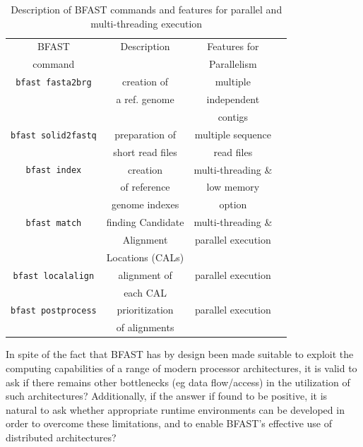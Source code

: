 \documentclass{acm_proc_article-sp}
\begin{document}
\begin{table}
\small
\begin{tabular}{|c|c|c|c|} 
  \hline BFAST & Description & Features for \\ command & & Parallelism
  \\ \hline \hline \texttt{bfast fasta2brg} & creation of & multiple \\ &a ref. genome &
  independent \\ & & contigs \\ \hline
  \texttt{bfast solid2fastq} & preparation of & multiple sequence \\ & short
  read files & read files\\ \hline

\texttt{bfast index} & creation  & multi-threading \& \\
& of reference  & low memory  \\ 
&genome indexes&option \\
 
  \hline
\texttt{bfast match} & finding Candidate   &  multi-threading \& \\

& Alignment &  parallel execution \\
& Locations (CALs) & \\\hline
\texttt{bfast localalign} & alignment of&   parallel execution \\
&  each CAL   & \\

  \hline
\texttt{bfast postprocess} & prioritization   &  parallel execution \\ 
& of alignments & \\
\hline


\hline
\end{tabular} \caption{Description of BFAST commands and features for parallel and multi-threading execution}
 \label{table:bfast-summary} 
\end{table}

In spite of the fact that BFAST has by design been made suitable to
exploit the computing capabilities of a range of modern processor
architectures, it is valid to ask if there remains other bottlenecks
(eg data flow/access) in the utilization of such architectures?
Additionally, if the answer if found to be positive, it is natural to
ask whether appropriate runtime environments can be developed in order
to overcome these limitations, and to enable BFAST's effective use of
distributed architectures?
\end{document}
